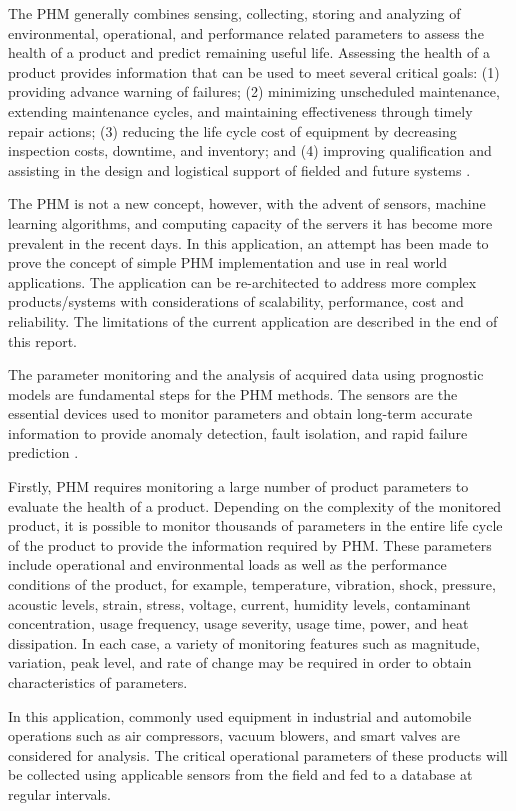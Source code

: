 \documentclass[sigconf]{acmart}
\begin{document}
The PHM generally combines sensing, collecting, storing and analyzing of environmental, operational, and performance related parameters to assess the health of a product and predict remaining useful life. Assessing the health of a product provides information that can be used to meet several critical goals: (1) providing advance warning of failures; (2) minimizing unscheduled maintenance, extending maintenance cycles, and maintaining effectiveness through timely repair actions; (3) reducing the life cycle cost of equipment by decreasing inspection costs, downtime, and inventory; and (4) improving qualification and assisting in the design and logistical support of fielded and future systems \cite{Shunfeng2010}.

The PHM is not a new concept, however, with the advent of sensors, machine learning algorithms, and computing capacity of the servers it has become more prevalent in the recent days. In this application, an attempt has been made to prove the concept of simple PHM implementation and use in real world applications. The application can be re-architected to address more complex products/systems with considerations of scalability, performance, cost and reliability. The limitations of the current application are described in the end of this report.

The parameter monitoring and the analysis of acquired data using prognostic models are fundamental steps for the PHM methods. The sensors are the essential devices used to monitor parameters and obtain long-term accurate information to provide anomaly detection, fault isolation, and rapid failure prediction \cite{Shunfeng2010}.

Firstly, PHM requires monitoring a large number of product parameters to evaluate the health of a product. Depending on the complexity of the monitored product, it is possible to monitor thousands of parameters in the entire life cycle of the product to provide the information required by PHM. These parameters include operational and environmental loads as well as the performance conditions of the product, for example, temperature, vibration, shock, pressure, acoustic levels, strain, stress, voltage, current, humidity levels, contaminant concentration, usage frequency, usage severity, usage time, power, and heat dissipation. In each case, a variety of monitoring features such as magnitude, variation, peak level, and rate of change may be required in order to obtain characteristics of parameters.

In this application, commonly used equipment in industrial and automobile operations such as air compressors, vacuum blowers, and smart valves are considered for analysis. The critical operational parameters of these products will be collected using applicable sensors from the field and fed to a database at regular intervals.
\end{document}
